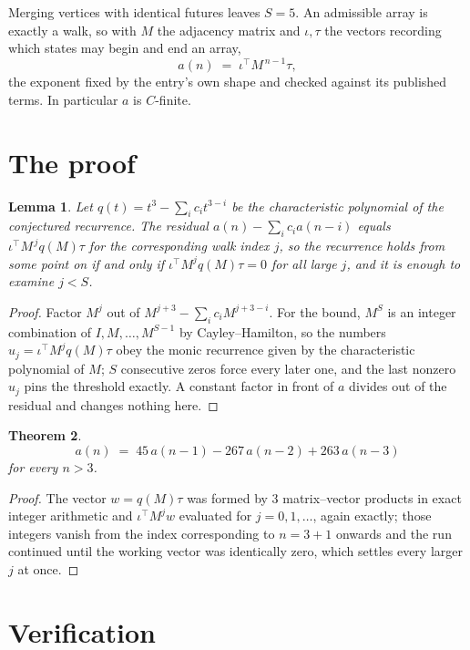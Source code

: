 \documentclass[11pt,a4paper]{article}
\theoremstyle{plain}
\newtheorem{theorem}{Theorem}
\newtheorem{lemma}[theorem]{Lemma}
\theoremstyle{definition}
\begin{document}
Merging vertices with identical futures leaves $S=5$. An admissible array is exactly a walk, so with $M$ the adjacency matrix and $\iota,\tau$ the vectors recording which states may begin and end an array,
\[
a(n)\;=\;\iota^{\!\top}M^{\,n-1}\tau ,
\]
the exponent fixed by the entry's own shape and checked against its published terms. In
particular $a$ is $C$-finite.

\section{The proof}

\begin{lemma}\label{lem:crit}
Let $q(t)=t^{3}-\sum_i c_it^{3-i}$ be the characteristic polynomial of the
conjectured recurrence. The residual $a(n)-\sum_ic_ia(n-i)$ equals
$\iota^{\!\top}M^{\,j}q(M)\tau$ for the corresponding walk index $j$, so the recurrence
holds from some point on if and only if $\iota^{\!\top}M^{j}q(M)\tau=0$ for all large $j$,
and it is enough to examine $j<S$.
\end{lemma}

\begin{proof}
Factor $M^{j}$ out of $M^{j+3}-\sum_ic_iM^{j+3-i}$. For the bound, $M^{S}$
is an integer combination of $I,M,\dots,M^{S-1}$ by Cayley--Hamilton, so the numbers
$u_j=\iota^{\!\top}M^{j}q(M)\tau$ obey the monic recurrence given by the characteristic
polynomial of $M$; $S$ consecutive zeros force every later one, and the last nonzero $u_j$
pins the threshold exactly. A constant factor in front of $a$ divides out of the residual and
changes nothing here.
\end{proof}

\begin{theorem}
\[
a(n)\;=\;45\,a(n-1) - 267\,a(n-2) + 263\,a(n-3)
\]
for every $n>3$.
\end{theorem}

\begin{proof}
The vector $w=q(M)\tau$ was formed by $3$ matrix--vector products in exact integer
arithmetic and $\iota^{\!\top}M^{j}w$ evaluated for $j=0,1,\dots$, again exactly; those
integers vanish from the index corresponding to $n=3+1$ onwards and the run continued
until the working vector was identically zero, which settles every larger $j$ at once.
\end{proof}

\section{Verification}
\end{document}
